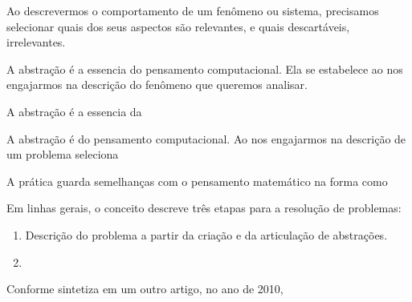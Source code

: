 Ao descrevermos o comportamento de um fenômeno ou sistema, precisamos selecionar quais dos seus aspectos são relevantes, e quais descartáveis, irrelevantes. 



A abstração é a essencia do pensamento computacional. Ela se estabelece ao nos engajarmos na descrição do fenômeno que queremos analisar. 


A abstração é a essencia da 

A abstração é  do pensamento computacional. Ao nos engajarmos na descrição de um problema seleciona







A prática guarda semelhanças com o pensamento matemático na forma como


Em linhas gerais, o conceito descreve três etapas para a resolução de problemas:

\begin{enumerate}
  \item Descrição do problema a partir da criação e da articulação de abstrações.
  \item 

\end{enumerate}




Conforme sintetiza em um outro artigo, no ano de 2010,






